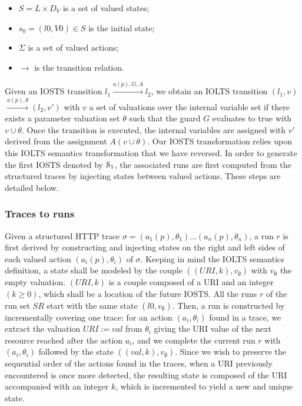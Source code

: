 \begin{itemize}
    \item $S = L \times D_V$ is a set of valued states;

    \item $s_0=(l0,V0) \in S$ is the initial state;

    \item $\Sigma$ is a set of valued actions;

    \item $\rightarrow$ is the transition relation.
\end{itemize}

Given an IOSTS transition $l_1 \xrightarrow{a(p),G,A}l_2$, we
obtain an IOLTS transition $(l_1,v)$ $\xrightarrow{a(p),\theta}
(l_2,v')$ with $v$ a set of valuations over the internal variable
set if there exists a parameter valuation set $\theta$ such that
the guard $G$ evaluates to true with $v \cup \theta$. Once the
transition is executed, the internal variables are assigned with
$v'$ derived from the assignment $A(v \cup \theta)$.
Our IOSTS transformation relies upon this IOLTS semantics
transformation that we have reversed.  In order to generate the
first IOSTS denoted by $\EuScript{S}_1$, the associated runs are
first computed from the structured traces by injecting states
between valued actions. These steps are detailed below.

\subsubsection{Traces to runs}

Given a structured HTTP trace $\sigma = (a_1(p),\theta_1) \dots
(a_n(p),\theta_n)$, a run $r$ is first derived by constructing
and injecting states on the right and left sides of
each valued action $(a_i(p),\theta_i)$ of $\sigma$. Keeping in
mind the IOLTS semantics definition, a state shall be modeled by
the couple $((URI,k),v_\emptyset)$ with $v_\emptyset$ the empty
valuation.  $(URI,k)$ is a couple composed of a URI and an
integer $(k \geq 0)$, which shall be a
location of the future IOSTS. All the runs $r$ of the run set
$SR$ start with the same state $(l0,v_\emptyset)$. Then, a run is
constructed by incrementally covering one trace: for an action
$(a_i,\theta_i)$ found in a trace, we extract the valuation
$URI:=val$ from $\theta_i$ giving the URI value of the next
resource reached after the action $a_i$, and we complete the
current run $r$ with $(a_i,\theta_i)$ followed by the state
$((val,k),v_\emptyset)$.  Since we wish to preserve the
sequential order of the actions found in the traces, when a URI
previously encountered is once more detected, the resulting state
is composed of the URI accompanied with an integer $k$, which is
incremented to yield a new and unique state.

